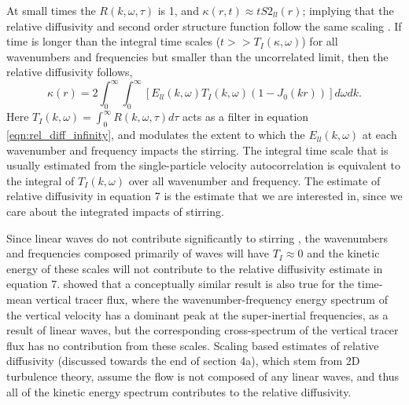 \documentclass[]{ametsoc}
\begin{document}
At small times the $R(k, \omega, \tau)$ is 1, and $\kappa(r,t) \approx t S2_{ll}(r) $; implying that the relative diffusivity and second order structure function follow the same scaling \citep{babiano1990relative}. If time is longer than the integral time scales ($t>>T_I(\kappa, \omega)$) for all wavenumbers and frequencies but smaller than the uncorrelated limit, then the relative diffusivity follows, 
\begin{equation}
\kappa(r) = 2\int_0^\infty \int_0^\infty \left[  E_{ll}(k, \omega) T_I(k, \omega)  (1- J_0(kr))  \right] d\omega dk.
\label{eqn:rel_diff_infinity}
\end{equation}
Here $T_I (k, \omega) = \int_0^\infty R(k, \omega, \tau) d\tau$ acts as a filter in equation \ref{eqn:rel_diff_infinity}, and modulates the extent to which the $E_{ll}(k,\omega)$ at each wavenumber and frequency impacts the stirring. The integral time scale that is usually estimated from the single-particle velocity autocorrelation \citep{lacasce2008statistics, balwada2016} is equivalent to the integral of $T_I(k,\omega)$ over all wavenumber and frequency. The estimate of relative diffusivity in equation 7 is the estimate that we are interested in, since we care about the integrated impacts of stirring.

Since linear waves do not contribute significantly to stirring \citep{holmes2011particle, buhler2013strong}, the wavenumbers and frequencies composed primarily of waves will have $T_I \approx 0$ and the kinetic energy of these scales will not contribute to the relative diffusivity estimate in equation 7. \citet{balwada2018submesoscale} showed that a conceptually similar result is also true for the time-mean vertical tracer flux, where the wavenumber-frequency energy spectrum of the vertical velocity has a dominant peak at the super-inertial frequencies, as a result of linear waves, but the corresponding cross-spectrum of the vertical tracer flux has no contribution from these scales. Scaling based estimates of relative diffusivity (discussed towards the end of section 4a), which stem from 2D turbulence theory, assume the flow is not composed of any linear waves, and thus all of the kinetic energy spectrum contributes to the relative diffusivity.



\end{document}
